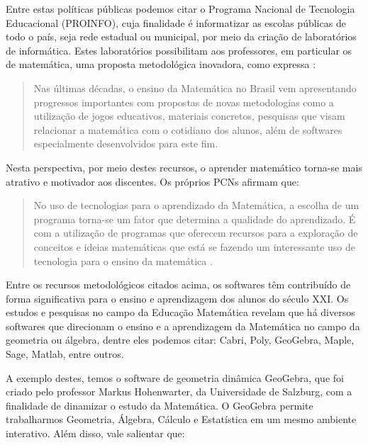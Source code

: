\begin{refsection}
    Entre estas políticas públicas podemos citar o Programa Nacional de Tecnologia Educacional (PROINFO), cuja finalidade é informatizar as escolas públicas de todo o país, seja rede estadual ou municipal, por meio da criação de laboratórios de informática. Estes laboratórios possibilitam aos professores, em particular os de matemática, uma proposta metodológica inovadora, como expressa \textcite[p.~20]{ROCHAAndPOFFALAndMENEGHETTI2015Utilização}: 

    \begin{quotation}
        Nas últimas décadas, o ensino da Matemática no Brasil vem apresentando progressos importantes com propostas de novas metodologias como a utilização de jogos educativos, materiais concretos, pesquisas que visam relacionar a matemática com o cotidiano dos alunos, além de softwares especialmente desenvolvidos para este fim.
    \end{quotation}

    Nesta perspectiva, por meio destes recursos, o aprender matemático torna-se mais atrativo e motivador aos discentes. Os próprios PCNs \cite{DocumentoInstitucional2006Parâmetros} afirmam que: 

    \begin{quotation}
        No uso de tecnologias para o aprendizado da Matemática, a escolha de um programa torna-se um fator que determina a qualidade do aprendizado. É com a utilização de programas que oferecem recursos para a exploração de conceitos e ideias matemáticas que está se fazendo um interessante uso de tecnologia para o ensino da matemática \cite[p.~89]{DocumentoInstitucional2006Parâmetros}. 
    \end{quotation}

    Entre os recursos metodológicos citados acima, os softwares têm contribuído de forma significativa para o ensino e aprendizagem dos alunos do século XXI. Os estudos e pesquisas no campo da Educação Matemática revelam que há diversos softwares que direcionam o ensino e a aprendizagem da Matemática no campo da geometria ou álgebra, dentre eles podemos citar: Cabri, Poly, GeoGebra, Maple, Sage, Matlab, entre outros. 

    A exemplo destes, temos o software de geometria dinâmica GeoGebra, que foi criado pelo professor Markus Hohenwarter, da Universidade de Salzburg, com a finalidade de dinamizar o estudo da Matemática. O GeoGebra permite trabalharmos Geometria, Álgebra, Cálculo e Estatística em um mesmo ambiente interativo. Além disso, vale salientar que: 


\end{refsection}

